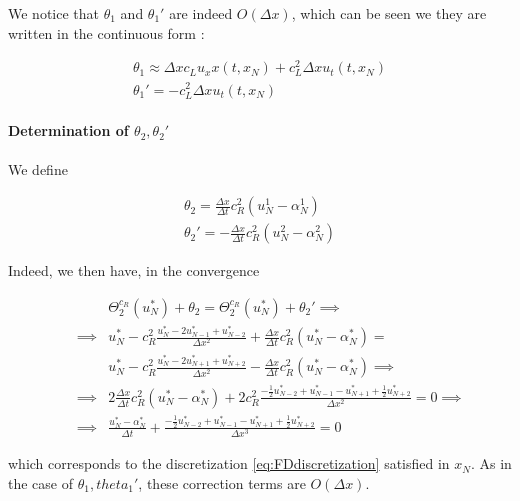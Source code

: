 \indent We notice that $\theta_1$ and $\theta_1'$ are indeed $O(\Delta x)$, which can be seen we they are written in the continuous form : 

\begin{gather*}
    \theta_1 \approx \Delta x c_L u_xx(t,x_N) + c_L^2\Delta x u_t(t,x_N)\\
    \theta_1' = - c_L^2\Delta x u_t(t,x_N)
\end{gather*}

\paragraph{Determination of $\theta_2, \theta_2'$}

\indent We define

\begin{equation*}
\begin{gathered}
    \theta_2 = \frac{\Delta x}{\Delta t} c_R^2 (u_N^1 - \alpha_N^1) \\
    \theta_2' = -\frac{\Delta x}{\Delta t} c_R^2 (u_N^2 - \alpha_N^2)
\end{gathered}
\end{equation*}

\indent Indeed, we then have, in the convergence

\begin{equation}
\label{eq:modifiedTBC2}
\begin{aligned}
&& &\Theta_2^{c_R}(u_N^*) + \theta_2 = \Theta_2^{c_R}(u_N^*) + \theta_2'\implies \\
&& \implies & u_N^* - c_R^2 \frac{u_N^* - 2u_{N-1}^* + u_{N-2}^*}{\Delta x^2} + \frac{\Delta x}{\Delta t} c_R^2 (u_N^* - \alpha_N^*)  = \\ && & u_N^* - c_R^2 \frac{u_N^* - 2u_{N+1}^* + u_{N+2}^*}{\Delta x^2} -\frac{\Delta x}{\Delta t} c_R^2 (u_N^* - \alpha_N^*) \implies \\
&& \implies & 2\frac{\Delta x}{\Delta t} c_R^2 (u_N^* - \alpha_N^*) + 2c_R^2 \frac{-\frac{1}{2}u_{N-2}^* + u_{N-1}^* - u_{N+1}^* + \frac{1}{2}u_{N+2}^* }{\Delta x^2} = 0  \implies \\
&& \implies &\frac{u_N^* - \alpha_N^*}{\Delta t} + \frac{-\frac{1}{2}u_{N-2}^* + u_{N-1}^* - u_{N+1}^* + \frac{1}{2}u_{N+2}^* }{\Delta x^3} = 0
\end{aligned}
\end{equation}

\noindent which corresponds to the discretization \eqref{eq:FDdiscretization} satisfied in $x_N$. As in the case of $\theta_1, theta_1'$, these correction terms are $O(\Delta x)$. 


